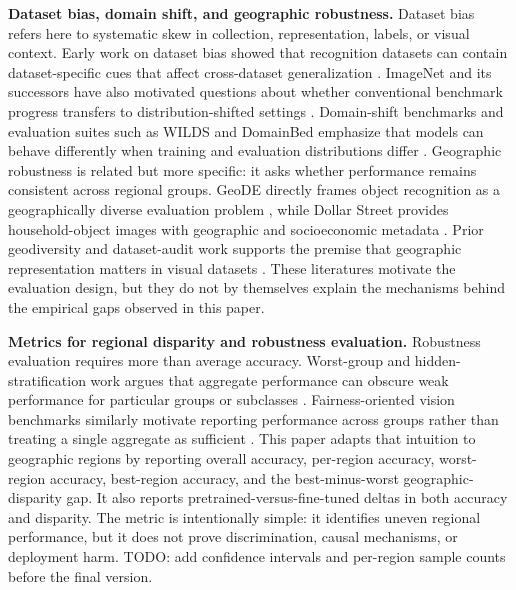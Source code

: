 \noindent\textbf{Dataset bias, domain shift, and geographic robustness.}
Dataset bias refers here to systematic skew in collection, representation, labels, or visual context. Early work on dataset bias showed that recognition datasets can contain dataset-specific cues that affect cross-dataset generalization \citep{torralba2011datasetbias}. ImageNet and its successors have also motivated questions about whether conventional benchmark progress transfers to distribution-shifted settings \citep{deng2009imagenet,recht2019imagenet,taori2020naturalshifts}. Domain-shift benchmarks and evaluation suites such as WILDS and DomainBed emphasize that models can behave differently when training and evaluation distributions differ \citep{koh2021wilds,gulrajani2021domainbed}. Geographic robustness is related but more specific: it asks whether performance remains consistent across regional groups. GeoDE directly frames object recognition as a geographically diverse evaluation problem \citep{ramaswamy2023geode}, while Dollar Street provides household-object images with geographic and socioeconomic metadata \citep{rojas2022dollarstreet}. Prior geodiversity and dataset-audit work supports the premise that geographic representation matters in visual datasets \citep{shankar2017geodiversity,wang2022revise,kalluri2023geonet}. These literatures motivate the evaluation design, but they do not by themselves explain the mechanisms behind the empirical gaps observed in this paper.

\noindent\textbf{Metrics for regional disparity and robustness evaluation.}
Robustness evaluation requires more than average accuracy. Worst-group and hidden-stratification work argues that aggregate performance can obscure weak performance for particular groups or subclasses \citep{sagawa2020groupdro,sohoni2020hiddenstratification}. Fairness-oriented vision benchmarks similarly motivate reporting performance across groups rather than treating a single aggregate as sufficient \citep{gustafson2023facet}. This paper adapts that intuition to geographic regions by reporting overall accuracy, per-region accuracy, worst-region accuracy, best-region accuracy, and the best-minus-worst geographic-disparity gap. It also reports pretrained-versus-fine-tuned deltas in both accuracy and disparity. The metric is intentionally simple: it identifies uneven regional performance, but it does not prove discrimination, causal mechanisms, or deployment harm. TODO: add confidence intervals and per-region sample counts before the final version.
